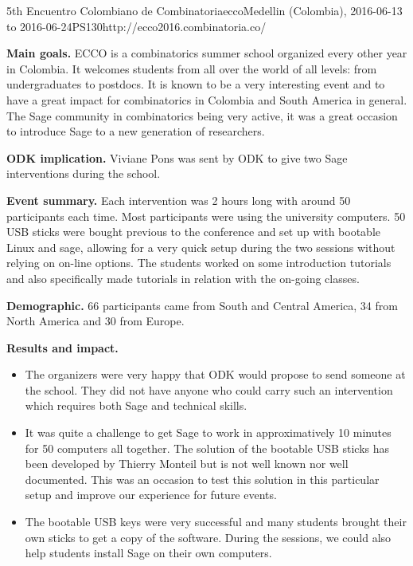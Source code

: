 \begin{event}{5th Encuentro Colombiano de Combinatoria}{ecco}{Medellin (Colombia), 2016-06-13 to 2016-06-24}{PS}{130}{http://ecco2016.combinatoria.co/}

\textbf{Main goals.} ECCO is a combinatorics summer school organized every other year in Colombia. It welcomes 
students from all over the world of all levels: from undergraduates to postdocs. It is known to be a very
interesting event and to have a great impact for combinatorics in Colombia and South America in general.
The Sage community in combinatorics being very active, it was a great occasion to introduce Sage
to a new generation of researchers.

\textbf{ODK implication.} Viviane Pons was sent by ODK to give two Sage interventions
during the school.

\textbf{Event summary.} Each intervention was 2 hours long with around 50 participants each time.
Most participants were using the university computers. 50 USB sticks were bought previous
to the conference and set up with bootable Linux and sage, allowing for a very quick setup
during the two sessions without relying on on-line options. The students worked on some
introduction tutorials and also specifically made tutorials in relation with the on-going
classes.  

\textbf{Demographic.} 66 participants came from South and Central America, 34 from North America
and 30 from Europe. 

\textbf{Results and impact.} 
\begin{itemize}
\item The organizers were very happy that ODK would propose to send someone at the school. 
They did not have anyone who could carry such an intervention which requires both Sage and
technical skills.

\item It was quite a challenge to get Sage to work in approximatively 10 minutes for 50
computers all together. The solution of the bootable USB sticks has been developed by Thierry
Monteil but is not well known nor well documented. This was an occasion to test this solution
in this particular setup and improve our experience for future events.

\item The bootable USB keys were very successful and many students brought their own sticks to
get a copy of the software. During the sessions, we could also help students install
Sage on their own computers.


\end{itemize}
\end{event}
